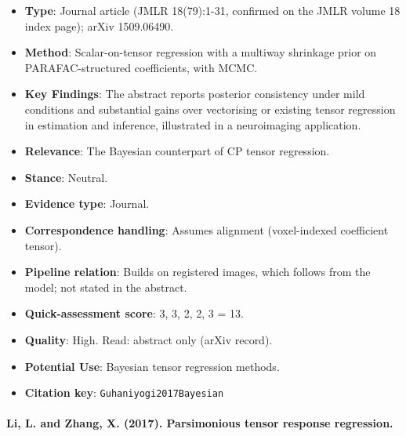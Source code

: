 \documentclass[journal,onecolumn]{IEEEtran}
\begin{document}
\begin{itemize}

\item{} \textbf{Type}: Journal article (JMLR 18(79):1-31, confirmed on the JMLR volume 18 index page); arXiv 1509.06490.

\item{} \textbf{Method}: Scalar-on-tensor regression with a multiway shrinkage prior on PARAFAC-structured coefficients, with MCMC.

\item{} \textbf{Key Findings}: The abstract reports posterior consistency under mild conditions and substantial gains over vectorising or existing tensor regression in estimation and inference, illustrated in a neuroimaging application.

\item{} \textbf{Relevance}: The Bayesian counterpart of CP tensor regression.

\item{} \textbf{Stance}: Neutral.

\item{} \textbf{Evidence type}: Journal.

\item{} \textbf{Correspondence handling}: Assumes alignment (voxel-indexed coefficient tensor).

\item{} \textbf{Pipeline relation}: Builds on registered images, which follows from the model; not stated in the abstract.

\item{} \textbf{Quick-assessment score}: 3, 3, 2, 2, 3 = 13.

\item{} \textbf{Quality}: High. Read: abstract only (arXiv record).

\item{} \textbf{Potential Use}: Bayesian tensor regression methods.

\item{} \textbf{Citation key}: \texttt{Guhaniyogi2017Bayesian}

\end{itemize}

\paragraph{Li, L. and Zhang, X. (2017). Parsimonious tensor response regression.~\cite{Li2017Parsimonious}}\mbox{}
\end{document}

